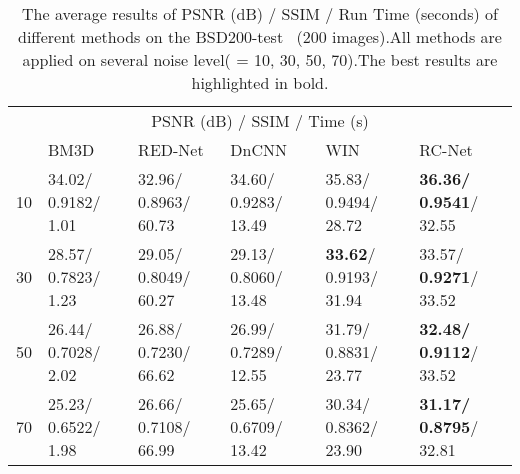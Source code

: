 \documentclass[10pt,twocolumn,letterpaper]{article}
\begin{document}
\begin{table*}[!]
\small
 \caption{ The average results of PSNR (dB) / SSIM / Run Time (seconds) of different methods on the BSD200-test~\cite{MartinFTM01} (200 images).All methods are applied on several noise level( = 10, 30, 50, 70).The best results are highlighted in bold.}
\label{tab:BSD-test}
\centering

  \begin{tabular}{llllll}
  \toprule
  \multicolumn{6}{c}{PSNR (dB) / SSIM / Time (s) }                   \\
    \cmidrule{1-6}
     & BM3D \cite{dabov2009bm3d}   & RED-Net \cite{mao2016image} & DnCNN \cite{zhang2016beyond} &  WIN~\cite{DBLP:journals/corr/LiuF17} &  RC-Net\\
     
    \midrule
    10  & 34.02/ 0.9182/ 1.01 & 32.96/ 0.8963/ 60.73 & 34.60/ 0.9283/ 13.49  & 35.83/ 0.9494/ 28.72  & \textbf {36.36/ 0.9541}/ 32.55     \\
    30  & 28.57/ 0.7823/ 1.23 & 29.05/ 0.8049/ 60.27 & 29.13/ 0.8060/ 13.48  & \textbf {33.62}/ 0.9193/ 31.94  &  33.57/ \textbf {0.9271}/ 33.52   \\
    50  & 26.44/ 0.7028/ 2.02 & 26.88/ 0.7230/ 66.62 & 26.99/ 0.7289/ 12.55  & 31.79/ 0.8831/ 23.77  & \textbf{32.48/ 0.9112}/ 33.52      \\
    70  & 25.23/ 0.6522/ 1.98 & 26.66/ 0.7108/ 66.99 & 25.65/ 0.6709/ 13.42  & 30.34/ 0.8362/ 23.90  & \textbf{31.17/ 0.8795}/ 32.81      \\
    \bottomrule
    
  \end{tabular} 
  \vspace{0.15 em}
\end{table*}
\medskip
\end{document}
